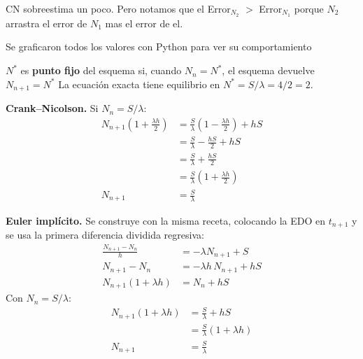 CN sobreestima un poco. Pero notamos que el Error$_{N_2}$ $>$ Error$_{N_1}$ porque $N_2$
arrastra el error de $N_1$ mas el error de el.

Se graficaron todos los valores con Python para ver su comportamiento

\begin{center}
\end{center}




$N^*$ es \textbf{punto fijo} del esquema si, cuando $N_n = N^*$, el esquema devuelve $N_{n+1} = N^*$
La ecuación exacta tiene equilibrio en $N^* = S/\lambda = 4/2 = 2$.

\textbf{Crank--Nicolson.} Si $N_n = S/\lambda$:
\begin{align*}
	N_{n+1}\left(1 + \frac{\lambda h}{2}\right) &= \frac{S}{\lambda}\left(1 - \frac{\lambda h}{2}\right) + hS\\
	&= \frac{S}{\lambda} - \frac{hS}{2} + hS\\
	&= \frac{S}{\lambda} + \frac{hS}{2}\\
	&= \frac{S}{\lambda}\left(1 + \frac{\lambda h}{2}\right)\\
	N_{n+1} &= \frac{S}{\lambda}
\end{align*}

\textbf{Euler implícito.} Se construye con la misma receta, colocando la EDO en $t_{n+1}$ y se usa la primera
diferencia dividida regresiva:
\begin{align*}
	\frac{N_{n+1} - N_n}{h} &= -\lambda N_{n+1} + S\\
	N_{n+1} - N_n &= -\lambda h\,N_{n+1} + hS\\
	N_{n+1}\left(1 + \lambda h\right) &= N_n + hS
\end{align*}
Con $N_n = S/\lambda$:
\begin{align*}
	N_{n+1}\left(1 + \lambda h\right) &= \frac{S}{\lambda} + hS\\
	&= \frac{S}{\lambda}\left(1 + \lambda h\right)\\
	N_{n+1} &= \frac{S}{\lambda}
\end{align*}



